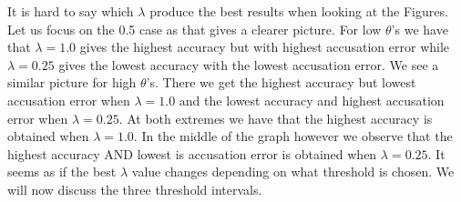 \begin{description}
        It is hard to say which $\lambda$ produce the best results when looking
        at the Figures. Let us focus on the 0.5 case as that gives a clearer
        picture. For low $\theta$'s we have that $\lambda = 1.0$ gives the
        highest accuracy but with highest accusation error while $\lambda =
        0.25$ gives the lowest accuracy with the lowest accusation error. We see
        a similar picture for high $\theta$'s. There we get the highest accuracy
        but lowest accusation error when $\lambda = 1.0$ and the lowest accuracy
        and highest accusation error when $\lambda = 0.25$. At both extremes we
        have that the highest accuracy is obtained when $\lambda = 1.0$. In the
        middle of the graph however we observe that the highest accuracy AND
        lowest is accusation error is obtained when $\lambda = 0.25$. It seems
        as if the best $\lambda$ value changes depending on what threshold is
        chosen. We will now discuss the three threshold intervals.


\end{description}
